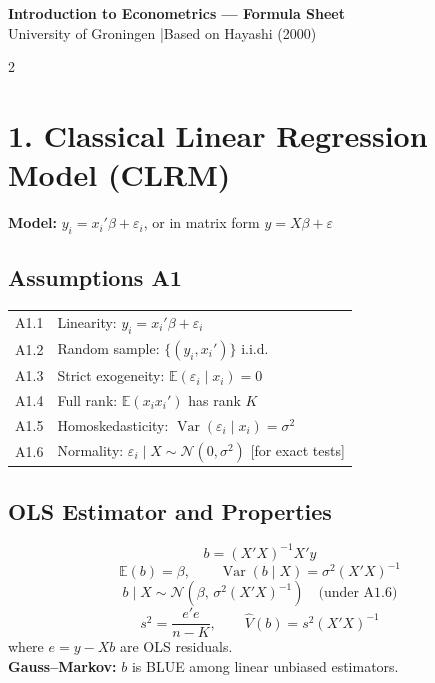 \documentclass[9pt,a4paper]{article}
\newcommand{\Var}{\operatorname{Var}}
\newcommand{\E}{\mathbb{E}}
\begin{document}
\begin{center}
  {\Large\bfseries Introduction to Econometrics --- Formula Sheet}\\[2pt]
  {\small University of Groningen \quad|\quad Based on Hayashi (2000)}
\end{center}

\vspace{4pt}
\begin{multicols}{2}

\section{1.\; Classical Linear Regression Model (CLRM)}

\textbf{Model:} $y_i = x_i'\beta + \varepsilon_i$, or in matrix form $y = X\beta + \varepsilon$

\subsection*{Assumptions A1}
\begin{tabular}{@{}lp{5.6cm}@{}}
  A1.1 & Linearity: $y_i = x_i'\beta + \varepsilon_i$ \\
  A1.2 & Random sample: $\{(y_i,x_i')\}$ i.i.d. \\
  A1.3 & Strict exogeneity: $\E(\varepsilon_i \mid x_i) = 0$ \\
  A1.4 & Full rank: $\E(x_ix_i')$ has rank $K$ \\
  A1.5 & Homoskedasticity: $\Var(\varepsilon_i \mid x_i) = \sigma^2$ \\
  A1.6 & Normality: $\varepsilon_i \mid X \sim \mathcal{N}(0,\sigma^2)$ \small{[for exact tests]}\\
\end{tabular}

\subsection*{OLS Estimator and Properties}
\[
  b = (X'X)^{-1}X'y
\]
\[
  \E(b) = \beta, \qquad \Var(b \mid X) = \sigma^2(X'X)^{-1}
\]
\[
  b \mid X \sim \mathcal{N}\!\left(\beta,\,\sigma^2(X'X)^{-1}\right) \quad \text{(under A1.6)}
\]
\[
  s^2 = \frac{e'e}{n-K}, \qquad \widehat{V}(b) = s^2(X'X)^{-1}
\]
where $e = y - Xb$ are OLS residuals.\\
\textbf{Gauss--Markov:} $b$ is BLUE among linear unbiased estimators.


\end{multicols}
\end{document}
